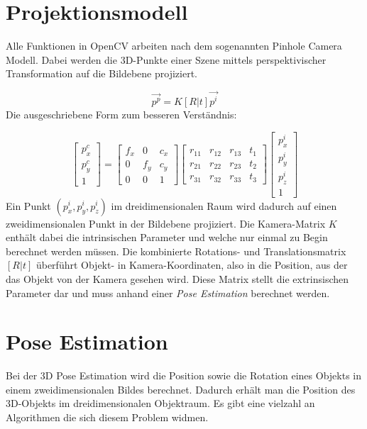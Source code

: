 \section{Projektionsmodell}
\label{sec:projektionsmodell}

Alle Funktionen in OpenCV arbeiten nach dem sogenannten Pinhole Camera Modell. Dabei werden die 3D-Punkte einer Szene mittels perspektivischer Transformation auf die Bildebene projiziert.

\begin{equation}
\vec{p^p} = K [R|t] \vec{p^i}
\end{equation}
\noindent
Die ausgeschriebene Form zum besseren Verständnis:

\begin{equation}
\begin{bmatrix}	
p^c_x \\ p^c_y \\ 1
\end{bmatrix} 
=
\begin{bmatrix}
f_x & 0 & c_x \\
0 & f_y & c_y \\
0 & 0 & 1
\end{bmatrix} 
\begin{bmatrix}
r_{11} & r_{12} & r_{13} & t_1 \\
r_{21} & r_{22} & r_{23} & t_2 \\
r_{31} & r_{32} & r_{33} & t_3
\end{bmatrix} 
\begin{bmatrix}
p^i_x \\ p^i_y \\ p^i_z \\ 1
\end{bmatrix} 
\end{equation}
\noindent
Ein Punkt $(p^i_x, p^i_y, p^i_z)$ im dreidimensionalen Raum wird dadurch auf einen zweidimensionalen Punkt in der Bildebene projiziert. Die Kamera-Matrix $K$ enthält dabei die intrinsischen Parameter und welche nur einmal zu Begin berechnet werden müssen. Die kombinierte Rotations- und Translationsmatrix $[R|t]$ überführt Objekt- in Kamera-Koordinaten, also in die Position, aus der das Objekt von der Kamera gesehen wird. Diese Matrix stellt die extrinsischen Parameter dar und muss anhand einer \textit{Pose Estimation} berechnet werden.

\section{Pose Estimation}
Bei der 3D Pose Estimation wird die Position sowie die Rotation eines Objekts in einem zweidimensionalen Bildes berechnet. Dadurch erhält man die Position des 3D-Objekts im dreidimensionalen Objektraum. Es gibt eine vielzahl an Algorithmen die sich diesem Problem widmen.

